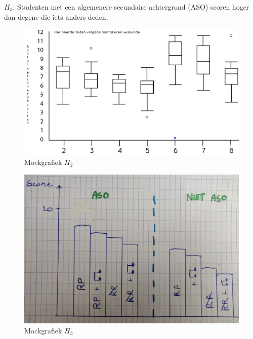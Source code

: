 \documentclass{hogent-article}
\begin{document}
	\textbf{$H_3$}: Studenten met een algemenere secundaire achtergrond (ASO) scoren hoger dan degene die iets anders deden.
	\begin{figure}[H]
		\includegraphics[width=\linewidth]{img/mockboxplot.png}
		\caption{Mockgrafiek \textbf{$H_2$}}
	\end{figure}
	\begin{figure}[H]
		\includegraphics[width=\linewidth]{img/imgg2.jpg}
		\caption{Mockgrafiek \textbf{$H_3$}}
	\end{figure}
	
\end{document}
